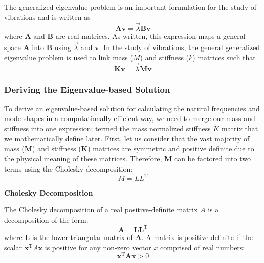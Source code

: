 \documentclass[12pt,letter]{article}
\begin{document}
\begin{review}
		The generalized eigenvalue problem is an important formulation for the study of vibrations and is written as 
		\begin{equation}
			\textbf{A}\textbf{v} = \vec{\lambda}\textbf{B}\textbf{v}
		\end{equation}	
		where $\textbf{A}$ and $\textbf{B}$ are real matrices. As written, this expression maps a general space $\textbf{A}$ into $\textbf{B}$ using $\vec{\lambda}$ and $\textbf{v}$. In the study of vibrations, the general generalized eigenvalue problem is used to link mass ($M$) and stiffness ($k$) matrices such that 
		\begin{equation}
			\textbf{K}\textbf{v} = \vec{\lambda}\textbf{M}\textbf{v}
		\end{equation}		
		
		
	\end{review}	

	
	
	\subsubsection{Deriving the Eigenvalue-based Solution}
	 
	To derive an eigenvalue-based solution for calculating the natural frequencies and mode shapes in a computationally efficient way, we need to merge our mass and stiffness into one expression; termed the  mass normalized stiffness $\widetilde{K}$ matrix that we mathematically define later. First, let us consider that the vast majority of mass ($\textbf{M}$) and stiffness ($\textbf{K}$) matrices are symmetric and positive definite due to the physical meaning of these matrices. Therefore, $\textbf{M}$ can be factored into two terms using the Cholesky decomposition:
		\begin{equation}
			M=LL^{\text{T}}
		\end{equation}
	\begin{review}
	\textbf{Cholesky Decomposition} 

		\noindent The Cholesky decomposition of a real positive-definite matrix $A$ is a decomposition of the form:
		\begin{equation}
			\textbf{A}=\textbf{LL}^{\text{T}}
			\end{equation}
		where $\textbf{L}$ is the lower triangular matrix of $\textbf{A}$. 	A matrix is positive definite if the scalar $\textbf{x}^{\text{T}}A\textbf{x}$ is positive for any non-zero vector $x$ comprised of real numbers:
		\begin{equation}
			\textbf{x}^{\text{T}}\textbf{A}\textbf{x} > 0
		\end{equation}
	\end{review}	
\end{document}
